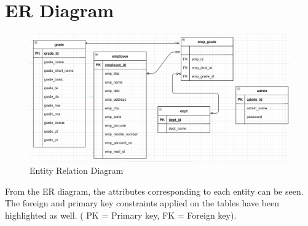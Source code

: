 \documentclass[12pt]{article}
\begin{document}
\newpage                %
\section{ER Diagram}    %

\begin{figure}[h!]
    \centering
    \includegraphics[width = \columnwidth]{er_diagram.png}
    \caption{Entity Relation Diagram}
    \label{fig:my_label}
\end{figure}
\noindent
From the ER diagram, the attributes corresponding to each entity can be seen. The foreign and primary key constraints applied on the tables have been highlighted as well. ( PK = Primary key, FK = Foreign key).


\newpage                            %
\end{document}
